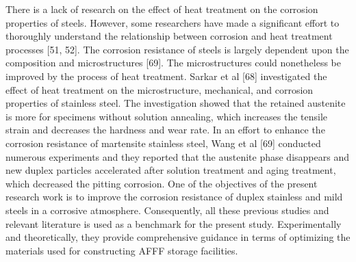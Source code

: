 \documentclass[12pt]{report}
\begin{document}
There is a lack of research on the effect of heat treatment on the corrosion properties of steels. However, some researchers have made a significant effort to thoroughly understand the relationship between corrosion and heat treatment processes [51, 52]. The corrosion resistance of steels is largely dependent upon the composition and microstructures [69]. The microstructures could nonetheless be improved by the process of heat treatment. Sarkar et al [68] investigated the effect of heat treatment on the microstructure, mechanical, and corrosion properties of stainless steel. The investigation showed that the retained austenite is more for specimens without solution annealing, which increases the tensile strain and decreases the hardness and wear rate. In an effort to enhance the corrosion resistance of martensite stainless steel, Wang et al [69] conducted numerous experiments and they reported that the austenite phase disappears and new duplex particles accelerated after solution treatment and aging treatment, which decreased the pitting corrosion. 
One of the objectives of the present research work is to improve the corrosion resistance of duplex stainless and mild steels in a corrosive atmosphere. Consequently, all these previous studies and relevant literature is used as a benchmark for the present study. Experimentally and theoretically, they provide comprehensive guidance in terms of optimizing the materials used for constructing AFFF storage facilities.
\end{document}
